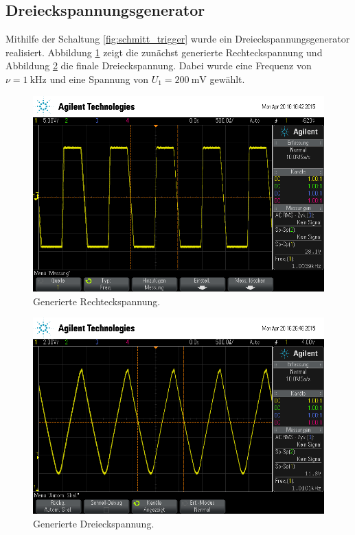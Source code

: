 \subsection{Dreieckspannungsgenerator} %
\label{sub:dreiecksgenerator}

Mithilfe der Schaltung \ref{fig:schmitt_trigger} wurde ein Dreieckspannungsgenerator realisiert.
Abbildung \ref{fig:rechteck} zeigt die zunächst generierte Rechteckspannung und Abbildung \ref{fig:dreieck} die finale Dreieckspannung.
Dabei wurde eine Frequenz von $\nu = \SI{1}{\kilo\hertz}$ und eine Spannung von $U_1 = \SI{200}{\milli\volt}$ gewählt.

\begin{figure}[!h]
    \centering
    \includegraphics[width=0.8\linewidth]{data/scope_13.png}
    \caption{Generierte Rechteckspannung.}
    \label{fig:rechteck}
\end{figure}

\begin{figure}[!h]
    \centering
    \includegraphics[width=0.8\linewidth]{data/scope_14.png}
    \caption{Generierte Dreieckspannung.}
    \label{fig:dreieck}
\end{figure}

